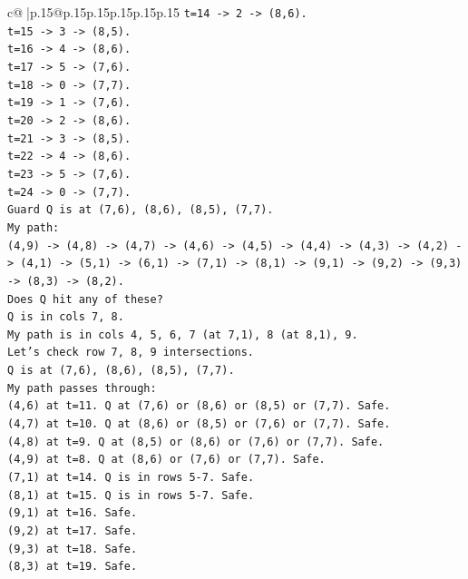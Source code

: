 \documentclass{article}
\begin{document}
{\begin{supertabular}{c@{$\;$}|p{.15\linewidth}@{}p{.15\linewidth}p{.15\linewidth}p{.15\linewidth}p{.15\linewidth}p{.15\linewidth}}
{{{\texttt{t=14 {-}> 2 {-}> (8,6).} \\
\texttt{t=15 {-}> 3 {-}> (8,5).} \\
\texttt{t=16 {-}> 4 {-}> (8,6).} \\
\texttt{t=17 {-}> 5 {-}> (7,6).} \\
\texttt{t=18 {-}> 0 {-}> (7,7).} \\
\texttt{t=19 {-}> 1 {-}> (7,6).} \\
\texttt{t=20 {-}> 2 {-}> (8,6).} \\
\texttt{t=21 {-}> 3 {-}> (8,5).} \\
\texttt{t=22 {-}> 4 {-}> (8,6).} \\
\texttt{t=23 {-}> 5 {-}> (7,6).} \\
\texttt{t=24 {-}> 0 {-}> (7,7).} \\
\texttt{Guard Q is at (7,6), (8,6), (8,5), (7,7).} \\
\texttt{My path:} \\
\texttt{(4,9) {-}> (4,8) {-}> (4,7) {-}> (4,6) {-}> (4,5) {-}> (4,4) {-}> (4,3) {-}> (4,2) {-}> (4,1) {-}> (5,1) {-}> (6,1) {-}> (7,1) {-}> (8,1) {-}> (9,1) {-}> (9,2) {-}> (9,3) {-}> (8,3) {-}> (8,2).} \\
\texttt{Does Q hit any of these?} \\
\texttt{Q is in cols 7, 8.} \\
\texttt{My path is in cols 4, 5, 6, 7 (at 7,1), 8 (at 8,1), 9.} \\
\texttt{Let's check row 7, 8, 9 intersections.} \\
\texttt{Q is at (7,6), (8,6), (8,5), (7,7).} \\
\texttt{My path passes through:} \\
\texttt{(4,6) at t=11. Q at (7,6) or (8,6) or (8,5) or (7,7). Safe.} \\
\texttt{(4,7) at t=10. Q at (8,6) or (8,5) or (7,6) or (7,7). Safe.} \\
\texttt{(4,8) at t=9. Q at (8,5) or (8,6) or (7,6) or (7,7). Safe.} \\
\texttt{(4,9) at t=8. Q at (8,6) or (7,6) or (7,7). Safe.} \\
\texttt{(7,1) at t=14. Q is in rows 5{-}7. Safe.} \\
\texttt{(8,1) at t=15. Q is in rows 5{-}7. Safe.} \\
\texttt{(9,1) at t=16. Safe.} \\
\texttt{(9,2) at t=17. Safe.} \\
\texttt{(9,3) at t=18. Safe.} \\
\texttt{(8,3) at t=19. Safe.} \\
}}}
\end{supertabular}}
\end{document}
